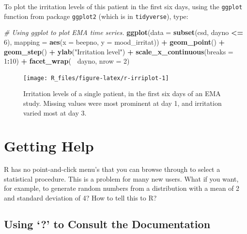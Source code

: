 \documentclass[]{book}
\newenvironment{Shaded}{\begin{snugshade}}{\end{snugshade}}
\newcommand{\KeywordTok}[1]{\textcolor[rgb]{0.13,0.29,0.53}{\textbf{#1}}}
\newcommand{\DataTypeTok}[1]{\textcolor[rgb]{0.13,0.29,0.53}{#1}}
\newcommand{\DecValTok}[1]{\textcolor[rgb]{0.00,0.00,0.81}{#1}}
\newcommand{\StringTok}[1]{\textcolor[rgb]{0.31,0.60,0.02}{#1}}
\newcommand{\CommentTok}[1]{\textcolor[rgb]{0.56,0.35,0.01}{\textit{#1}}}
\newcommand{\OperatorTok}[1]{\textcolor[rgb]{0.81,0.36,0.00}{\textbf{#1}}}
\newcommand{\NormalTok}[1]{#1}
\begin{document}
To plot the irritation levels of this patient in the first six days,
using the \texttt{ggplot} function from package \texttt{ggplot2} (which
is in \texttt{tidyverse}), type:

\begin{Shaded}
\begin{Highlighting}[]
\CommentTok{# Using ggplot to plot EMA time series.}
\KeywordTok{ggplot}\NormalTok{(}\DataTypeTok{data =} \KeywordTok{subset}\NormalTok{(csd, dayno }\OperatorTok{<=}\StringTok{ }\DecValTok{6}\NormalTok{),}
       \DataTypeTok{mapping =}  \KeywordTok{aes}\NormalTok{(}\DataTypeTok{x =}\NormalTok{ beepno, }\DataTypeTok{y =}\NormalTok{ mood_irritat)) }\OperatorTok{+}\StringTok{ }
\StringTok{  }\KeywordTok{geom_point}\NormalTok{() }\OperatorTok{+}\StringTok{  }\KeywordTok{geom_step}\NormalTok{() }\OperatorTok{+}\StringTok{ }
\StringTok{  }\KeywordTok{ylab}\NormalTok{(}\StringTok{"Irritation level"}\NormalTok{) }\OperatorTok{+}\StringTok{ }
\StringTok{  }\KeywordTok{scale_x_continuous}\NormalTok{(}\DataTypeTok{breaks =} \DecValTok{1}\OperatorTok{:}\DecValTok{10}\NormalTok{) }\OperatorTok{+}
\StringTok{  }\KeywordTok{facet_wrap}\NormalTok{(}\OperatorTok{~}\StringTok{ }\NormalTok{dayno, }\DataTypeTok{nrow =} \DecValTok{2}\NormalTok{)}
\end{Highlighting}
\end{Shaded}

\begin{figure}

{\centering \texttt{[image: R\_files/figure-latex/r-irriplot-1]} 

}

\caption{Irritation levels of a single patient, in the first six days of an EMA study. Missing values were most prominent at day 1, and irritation varied most at day 3.}\label{fig:r-irriplot}
\end{figure}

\section{Getting Help}\label{getting-help}


R has no point-and-click menu's that you can browse through to select a
statistical procedure. This is a problem for many new users. What if you
want, for example, to generate random numbers from a distribution with a
mean of 2 and standard deviation of 4? How to tell this to R?

\subsection{\texorpdfstring{Using `?' to Consult the
Documentation}{Using ? to Consult the Documentation}}\label{using-to-consult-the-documentation}
\end{document}
